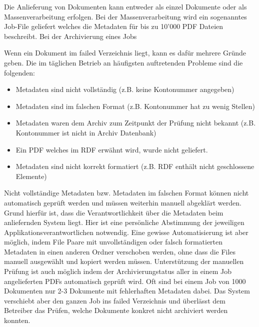 \documentclass[a4paper,oneside, 12pt]{report}
\begin{document}
Die Anlieferung von Dokumenten kann entweder als einzel Dokumente oder als Massenverarbeitung erfolgen. Bei der Massenverarbeitung wird ein sogenanntes Job-File geliefert welches die Metadaten für bis zu 10'000 PDF Dateien beschreibt. Bei der Archivierung eines Jobs 

Wenn ein Dokument im failed Verzeichnis liegt, kann es dafür mehrere Gründe geben. Die im täglichen Betrieb an häufigsten auftretenden Probleme sind die folgenden:
\begin{itemize}\itemsep=0.5pt
  \item Metadaten sind nicht vollständig  (z.B. keine Kontonummer angegeben)
  \item Metadaten sind im falschen Format (z.B. Kontonummer hat zu wenig Stellen)
  \item Metadaten waren dem Archiv zum Zeitpunkt der Prüfung nicht bekannt (z.B. Kontonummer ist nicht in Archiv Datenbank)
  \item Ein PDF welches im RDF erwähnt wird, wurde nicht geliefert.
  \item Metadaten sind nicht korrekt formatiert (z.B. RDF enthält nicht geschlossene Elemente)
\end{itemize}

Nicht vollständige Metadaten bzw. Metadaten im falschen Format können nicht automatisch geprüft werden und müssen weiterhin manuell abgeklärt werden. Grund hierfür ist, dass die Verantwortlichkeit über die Metadaten beim anliefernden System liegt. Hier ist eine persönliche Abstimmung der jeweiligen Applikationsverantwortlichen notwendig. Eine gewisse Automatisierung ist aber möglich, indem File Paare mit unvollständigen oder falsch formatierten Metadaten in einen anderen Ordner verschoben werden, ohne dass die Files manuell ausgewählt und kopiert werden müssen. Unterstützung der manuellen Prüfung ist auch möglich indem der Archivierungstatus aller in einem Job angelieferten PDFs automatisch geprüft wird. Oft sind bei einem Job von 1000 Dokumenten nur 2-3 Dokumente mit fehlerhaften Metadaten dabei. Das System verschiebt aber den ganzen Job ins failed Verzeichnis und überlässt dem Betreiber das Prüfen, welche Dokumente konkret nicht archiviert werden konnten.
\end{document}
